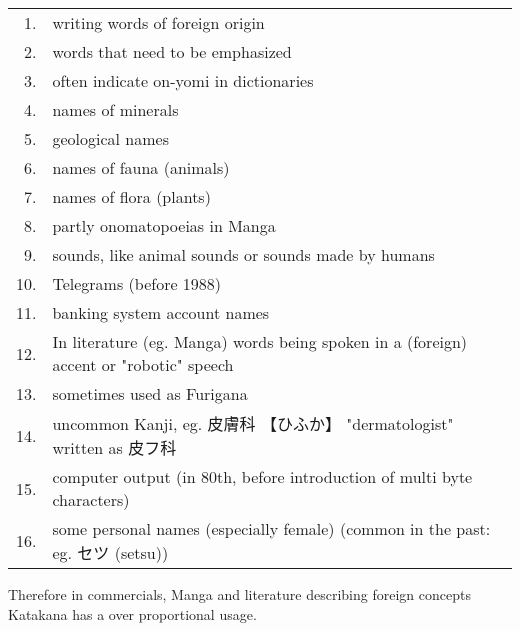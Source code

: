 \begin{tabular}{rp{15cm}}
1.& writing words of foreign origin\\
2.& words that need to be emphasized\\
3. &often indicate on-yomi in dictionaries\\
4.& names of minerals \\
5.& geological names \\
6.& names of fauna (animals)\\
7.& names of flora (plants)\\
8.& partly onomatopoeias in Manga\\
9.& sounds, like animal sounds or sounds made by humans\\
10.& Telegrams (before 1988)\\
11.& banking system account names\\
12.& In literature (eg. Manga) words being spoken in a (foreign) accent or "robotic" speech\\
13. &sometimes used as Furigana\\
14. & uncommon Kanji, eg.  {皮膚科} {【ひふか】} "dermatologist" written as {皮フ科}\\
15.& computer output (in 80th, before introduction of multi byte characters)\\
16. &some personal names (especially female) (common in the past: eg. セツ (setsu))\\
\end{tabular}

\medskip

Therefore in commercials, Manga and literature describing foreign concepts
Katakana has a over proportional usage.



%

